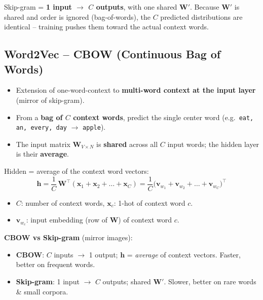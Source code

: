 \documentclass[10pt,a4paper]{article}
\begin{document}
	\begin{importantbox}
		Skip-gram = \textbf{1 input $\to$ $C$ outputs}, with one shared $\mathbf{W}'$. Because $\mathbf{W}'$ is shared and order is ignored (bag-of-words), the $C$ predicted distributions are identical -- training pushes them toward the actual context words.
	\end{importantbox}

	\subsection{Word2Vec -- CBOW (Continuous Bag of Words)}

	\begin{itemize}[leftmargin=*]
		\item Extension of one-word-context to \textbf{multi-word context at the input layer} (mirror of skip-gram).
		\item From a \textbf{bag of $C$ context words}, predict the single center word (e.g.\ \texttt{eat, an, every, day} $\to$ \texttt{apple}).
		\item The input matrix $\mathbf{W}_{V\times N}$ is \textbf{shared} across all $C$ input words; the hidden layer is their \textbf{average}.
	\end{itemize}

	\begin{formulabox}
		Hidden = average of the context word vectors:
		\[
		\mathbf{h} = \frac{1}{C}\,\mathbf{W}^{\top}(\mathbf{x}_1 + \mathbf{x}_2 + \dots + \mathbf{x}_C)
		      = \frac{1}{C}\big(\mathbf{v}_{w_1} + \mathbf{v}_{w_2} + \dots + \mathbf{v}_{w_C}\big)^{\top}
		\]
		\begin{itemize}[leftmargin=1.2em]
			\item $C$: number of context words, \; $\mathbf{x}_c$: 1-hot of context word $c$.
			\item $\mathbf{v}_{w_c}$: input embedding (row of $\mathbf{W}$) of context word $c$.
		\end{itemize}
	\end{formulabox}

	\begin{importantbox}
		\textbf{CBOW vs Skip-gram} (mirror images):
		\begin{itemize}[leftmargin=1.2em, nosep]
			\item \textbf{CBOW}: $C$ inputs $\to$ 1 output; $\mathbf{h}$ = \emph{average} of context vectors. Faster, better on frequent words.
			\item \textbf{Skip-gram}: 1 input $\to$ $C$ outputs; shared $\mathbf{W}'$. Slower, better on rare words \& small corpora.
		\end{itemize}
	\end{importantbox}
\end{document}
